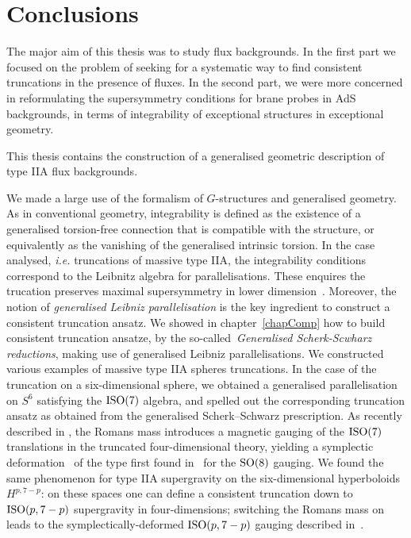 \documentclass[debug]{phd}
\begin{document}
	\chapter*{Conclusions}
	
		The major aim of this thesis was to study flux backgrounds.
		In the first part we focused on the problem of seeking for a systematic way to find consistent truncations in the presence of fluxes.
		In the second part, we were more concerned in reformulating the supersymmetry conditions for brane probes in AdS backgrounds, in terms of integrability of exceptional structures in exceptional geometry.
	
		This thesis contains the construction of a generalised geometric description of type IIA flux backgrounds.
		
		We made a large use of the formalism of $G$-structures and generalised geometry.
		As in conventional geometry, integrability is defined as the existence of a generalised torsion-free connection that is compatible with the structure, or equivalently as the vanishing of the generalised intrinsic torsion.
		In the case analysed, \emph{i.e.} truncations of massive type IIA, the integrability conditions correspond to the Leibnitz algebra for parallelisations.
		These enquires the trucation preserves maximal supersymmetry in lower dimension~\cite{spheres}.
		Moreover, the notion of \emph{generalised Leibniz parallelisation} is the key ingredient to construct a consistent truncation ansatz.
		We showed in chapter~\ref{chapComp} how to build consistent truncation ansatze, by the so-called~\emph{Generalised Scherk-Scwharz reductions}, making use of generalised Leibniz parallelisations.
		We constructed various examples of massive type IIA spheres truncations.
		In the case of the truncation on a six-dimensional sphere, we obtained a generalised parallelisation on $S^6$ satisfying the $\mathrm{ISO}(7)$ algebra, and spelled out the corresponding truncation ansatz as obtained from the generalised Scherk--Schwarz prescription. 
		As recently described in \cite{Guarino:2015jca,Guarino:2015vca}, the Romans mass introduces a magnetic gauging of the $\mathrm{ISO}(7)$ translations in the truncated four-dimensional theory, yielding a symplectic deformation~\cite{Dall'Agata:2014ita} of the type first found in~\cite{Dall'Agata:2012bb} for the $\mathrm{SO}(8)$ gauging.
		We found the same phenomenon for type IIA supergravity on the six-dimensional hyperboloids $H^{p,7-p}$: on these spaces one can define a consistent truncation down to $\mathrm{ISO}(p,7-p)$ supergravity in four-dimensions; switching the Romans mass on leads to the symplectically-deformed $\mathrm{ISO}(p,7-p)$ gauging described in~\cite{Dall'Agata:2014ita}.
\end{document}
